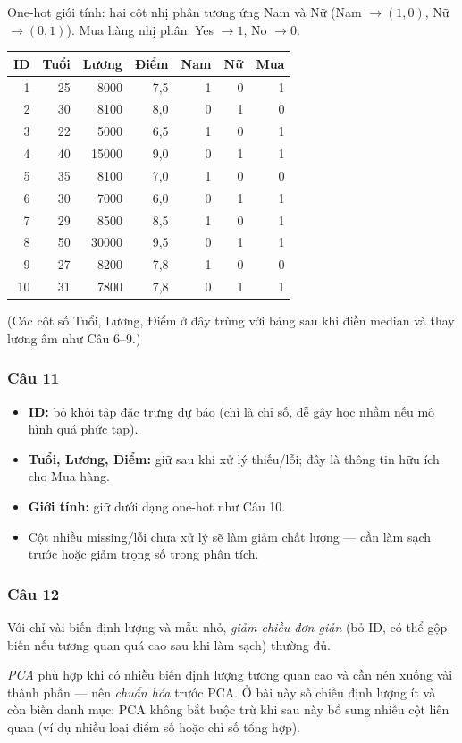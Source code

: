 One-hot giới tính: hai cột nhị phân tương ứng Nam và Nữ (Nam $\to(1,0)$, Nữ $\to(0,1)$). Mua hàng nhị phân: Yes $\to1$, No $\to0$.

\begin{center}
\small
\begin{tabular}{rrrrrrr}
ID & Tuổi & Lương & Điểm & Nam & Nữ & Mua\\\hline
1 & 25 & 8000 & 7{,}5 & 1 & 0 & 1 \\
2 & 30 & 8100 & 8{,}0 & 0 & 1 & 0 \\
3 & 22 & 5000 & 6{,}5 & 1 & 0 & 1 \\
4 & 40 & 15000 & 9{,}0 & 0 & 1 & 1 \\
5 & 35 & 8100 & 7{,}0 & 1 & 0 & 0 \\
6 & 30 & 7000 & 6{,}0 & 0 & 1 & 1 \\
7 & 29 & 8500 & 8{,}5 & 1 & 0 & 1 \\
8 & 50 & 30000 & 9{,}5 & 0 & 1 & 1 \\
9 & 27 & 8200 & 7{,}8 & 1 & 0 & 0 \\
10 & 31 & 7800 & 7{,}8 & 0 & 1 & 1 \\
\end{tabular}
\end{center}

(Các cột số Tuổi, Lương, Điểm ở đây trùng với bảng sau khi điền median và thay lương âm như Câu 6--9.)

\subsubsection*{Câu 11}

\begin{itemize}
  \item \textbf{ID:} bỏ khỏi tập đặc trưng dự báo (chỉ là chỉ số, dễ gây học nhầm nếu mô hình quá phức tạp).
  \item \textbf{Tuổi, Lương, Điểm:} giữ sau khi xử lý thiếu/lỗi; đây là thông tin hữu ích cho Mua hàng.
  \item \textbf{Giới tính:} giữ dưới dạng one-hot như Câu 10.
  \item Cột nhiều missing/lỗi chưa xử lý sẽ làm giảm chất lượng --- cần làm sạch trước hoặc giảm trọng số trong phân tích.
\end{itemize}

\subsubsection*{Câu 12}

Với chỉ vài biến định lượng và mẫu nhỏ, \emph{giảm chiều đơn giản} (bỏ ID, có thể gộp biến nếu tương quan quá cao sau khi làm sạch) thường đủ.

\emph{PCA} phù hợp khi có nhiều biến định lượng tương quan cao và cần nén xuống vài thành phần --- nên \emph{chuẩn hóa} trước PCA. Ở bài này số chiều định lượng ít và còn biến danh mục; PCA không bắt buộc trừ khi sau này bổ sung nhiều cột liên quan (ví dụ nhiều loại điểm số hoặc chỉ số tổng hợp).
